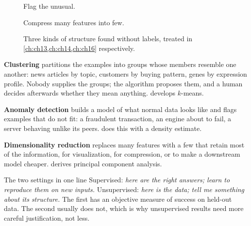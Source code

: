 \begin{figure}[htbp]
\begin{minipage}[t]{0.32\linewidth}
\begin{tikzpicture}
    \end{tikzpicture}
    {\scriptsize Flag the unusual.\par}
  \end{minipage}\hfill
  \begin{minipage}[t]{0.32\linewidth}
    \centering
    {\scriptsize Compress many features into few.\par}
  \end{minipage}
  \caption{Three kinds of structure found without labels, treated in
  \cref{ch:ch13,ch:ch14,ch:ch16} respectively.}
  \label{fig:unsupervised}
\end{figure}

\textbf{Clustering} partitions the examples into groups whose members resemble
one another: news articles by topic, customers by buying pattern, genes by
expression profile. Nobody supplies the groups; the algorithm proposes them, and
a human decides afterwards whether they mean anything.  develops
$k$-means.

\textbf{Anomaly detection} builds a model of what normal data looks like and
flags examples that do not fit: a fraudulent transaction, an engine about to
fail, a server behaving unlike its peers.  does this with a
density estimate.

\textbf{Dimensionality reduction} replaces many features with a few that retain
most of the information, for visualization, for compression, or to make a
downstream model cheaper.  derives principal component analysis.

\begin{keyinsight}{The two settings in one line}
Supervised: \emph{here are the right answers; learn to reproduce them on new
inputs.} Unsupervised: \emph{here is the data; tell me something about its
structure.} The first has an objective measure of success on held-out data. The
second usually does not, which is why unsupervised results need more careful
justification, not less.
\end{keyinsight}

